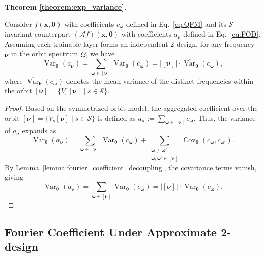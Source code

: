 \documentclass[%
 reprint,
 amsmath,amssymb,
 aps,
 pra,
]{revtex4-2}
\theoremstyle{definition}
\newenvironment{restate}[2]{%
  \par\noindent\textbf{#1 \ref{#2}. }\itshape%
}{\par\medskip}
\begin{document}
\begin{restate}{Theorem}{theorem:exp_variance}
Consider \(f(\bm{x}, \bm{\theta})\) with coefficients \(c_{\bm{\omega}}\) defined in Eq.~\eqref{eq:QFM} and its \(\mathcal{S}\)-invariant counterpart \((\mathcal{A}f)(\bm{x}, \bm{\theta})\) with coefficients \(a_{\bm{\nu}}\) defined in Eq.~\eqref{eq:FOD}. Assuming each trainable layer forms an independent 2-design, for any frequency \(\bm{\nu}\) in the orbit spectrum \(\tilde{\Omega}\), we have
\begin{equation}
\operatorname{Var}_{\bm{\theta}}(a_{\bm{\nu}}) = \sum_{\bm{\omega} \in [\bm{\nu}]} \operatorname{Var}_{\bm{\theta}}(c_{\bm{\omega}}) = |[\bm{\nu}]| \cdot \overline{\operatorname{Var}}_{\bm{\theta}}(c_{\bm{\omega}}),
\end{equation}
where \(\overline{\operatorname{Var}}_{\bm{\theta}}(c_{\bm{\omega}})\) denotes the mean variance of the distinct frequencies within the orbit \([\bm{\nu}]=\{ V_s[\bm{\nu}] \mid s \in \mathcal{S} \}\).
\end{restate}

\begin{proof}
Based on the symmetrized orbit model, the aggregated coefficient over the orbit \([\bm{\nu}]=\{ V_s[\bm{\nu}] \mid s \in \mathcal{S} \}\) is defined as \(a_{\bm{\nu}} := \sum_{\bm{\omega} \in [\bm{\nu}]} c_{\bm{\omega}}\). Thus, the variance of \(a_{\bm{\nu}}\) expands as
\begin{equation}
\label{eq:var_expansion}
\operatorname{Var}_{\bm{\theta}}(a_{\bm{\nu}}) = \sum_{\bm{\omega} \in [\bm{\nu}]} \operatorname{Var}_{\bm{\theta}}(c_{\bm{\omega}}) + \sum_{\substack{\bm{\omega} \neq \bm{\omega}' \\ \bm{\omega}, \bm{\omega}' \in [\bm{\nu}]}} \operatorname{Cov}_{\bm{\theta}}(c_{\bm{\omega}}, c_{\bm{\omega}'}).
\end{equation}
By Lemma~\ref{lemma:fourier_coefficient_decoupling}, the covariance terms vanish, giving
\begin{equation}
\operatorname{Var}_{\bm{\theta}}(a_{\bm{\nu}}) = \sum_{\bm{\omega} \in [\bm{\nu}]} \operatorname{Var}_{\bm{\theta}}(c_{\bm{\omega}})
= |[\bm{\nu}]| \cdot \overline{\operatorname{Var}}_{\bm{\theta}}(c_{\bm{\omega}}).
\end{equation}
\end{proof}


\subsection{Fourier Coefficient Under Approximate 2-design}
\label{sec:fourier_coefficient_approximate_2design}
\end{document}
